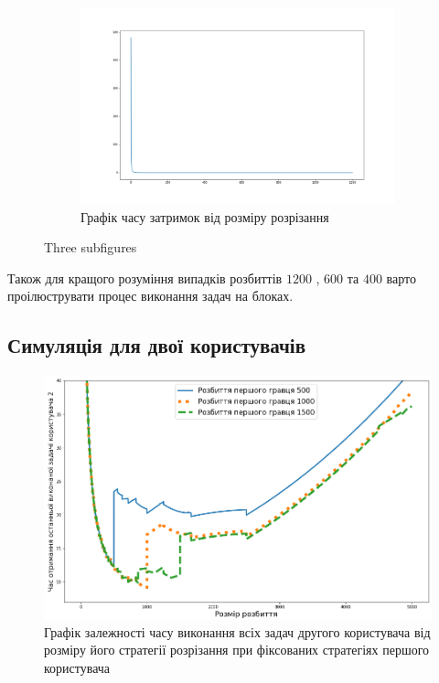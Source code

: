 \begin{figure}[H]
	\begin{subfigure}[b]{0.5\linewidth}
		\centering
		\includegraphics[width=\textwidth]{practice/img/latency_time_sep}
		\caption{Графік часу затримок від розміру розрізання}
		\label{fig:latency_time_sep}
	\end{subfigure}
	\caption{Three subfigures}
	\label{fig:test}	
\end{figure}

Також для кращого розуміння випадків розбиттів $1200$ , $600$ та $400$ варто проілюструвати процес виконання задач на блоках.

\subsection{Симуляція для двої користувачів}

\begin{figure}[H]
	\centering
	\includegraphics[width=\textwidth]{practice/img/two_users_fixed_first}
	\caption{Графік залежності часу виконання всіх задач другого користувача від розміру його стратегії розрізання при фіксованих стратегіях першого користувача}
	\label{fig:two_users_fixed_first}
\end{figure}

